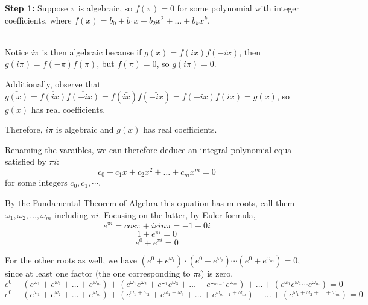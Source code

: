 \documentclass{article}
\begin{document}


\textbf{Step 1:} Suppose $\pi$ is algebraic, so 
$f(\pi) = 0$ for some polynomial with integer coefficients, where
$f(x) = b_0 + b_1x + b_2x^2 + \ldots + b_kx^k$.\\\\

\medskip

Notice $i\pi$ is then algebraic because if $g(x) = f(ix)f(-ix)$, then $g(i\pi) = f(-\pi)f(\pi)$, 
but $f(\pi) = 0$, so $g(i\pi) = 0$.

\medskip

Additionally, observe that $\bar{g(x)} = \overline{f(ix)}\overline{f(-ix)} = f(\bar{ix})f(\bar{-ix}) = f(-ix)f(ix) = g(x)$, so $g(x)$ has real coefficients.

\medskip

Therefore, $i\pi$ is algebraic and $g(x)$ has real coefficients.

Renaming the varaibles, we  can therefore deduce an integral 
polynomial equa satisfied by $\pi i$: \[c_0 + c_1x + c_2x^2 + \ldots + c_mx^m = 0 \tag{4}\] for 
some integers $c_0, c_1, \cdots$.

By the Fundamental Theorem of Algebra this equation has m roots, call them 
$\omega_1, \omega_2, \ldots, \omega_m$ including $\pi i$. Focusing on 
the latter, by Euler formula, \[e^{\pi i} = cos \pi + i sin \pi = -1 + 0i \]
\[ 1 + e^{\pi i} = 0 \]
\[ e^0 + e^{\pi i} = 0 \]

For the other roots as well, we  have $(e^0 + e^{\omega_1}) \cdot (e^0 + e^{\omega_2}) \cdots (e^0 + e^{\omega_m}) = 0$, 
since at least one factor (the one corresponding to $\pi i$) is zero.
\[ e^0 + (e^{\omega_1} + e^{\omega_2} + \ldots + e^{\omega_m}) + (e^{\omega_1}e^{\omega_2} + e^{\omega_1}e^{\omega_3} + \ldots + e^{\omega_{m-1}}e^{\omega_m}) + \ldots + (e^{\omega_1}e^{\omega_2} \cdots e^{\omega_m}) = 0 \]
\[ e^0 + (e^{\omega_1} + e^{\omega_2} + \ldots + e^{\omega_m}) + (e^{\omega_1 + \omega_2} + e^{\omega_1 + \omega_3} + \ldots + e^{\omega_{m-1} + \omega_m}) + \ldots + (e^{\omega_1 + \omega_2 + \ldots + \omega_m}) = 0 \]
\end{document}

